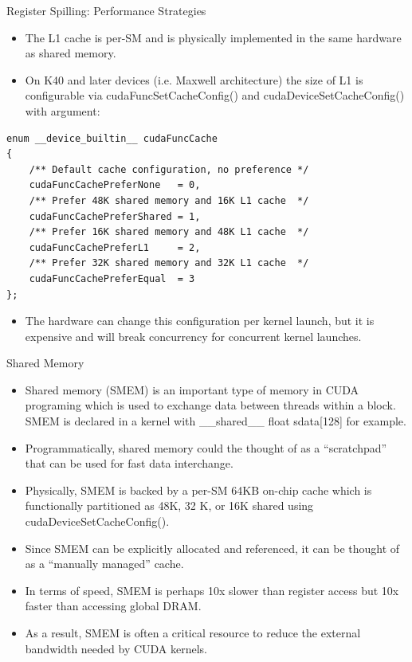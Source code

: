 \documentclass[handout]{beamer}
\begin{document}
\begin{frame}[fragile]{Register Spilling: Performance Strategies}
\begin{itemize}
         \item<1->The L1 cache is per-SM and is physically implemented in the same hardware as shared memory.
	\item<1->On K40 and later devices (i.e. Maxwell architecture) the size of L1 is configurable via {\selectfont cudaFuncSetCacheConfig()} and {\selectfont cudaDeviceSetCacheConfig()} with argument:
\end{itemize}
	\begin{lstlisting}
enum __device_builtin__ cudaFuncCache
{
    /** Default cache configuration, no preference */
    cudaFuncCachePreferNone   = 0,
    /** Prefer 48K shared memory and 16K L1 cache  */
    cudaFuncCachePreferShared = 1,
    /** Prefer 16K shared memory and 48K L1 cache  */
    cudaFuncCachePreferL1     = 2, 
    /** Prefer 32K shared memory and 32K L1 cache  */
    cudaFuncCachePreferEqual  = 3
};	
\end{lstlisting}
\begin{itemize}
	\item<1->The hardware can change this configuration per kernel launch, but it is expensive and will break concurrency for concurrent kernel launches.
\end{itemize}

\end{frame}

\begin{frame}{Shared Memory}
\begin{itemize}
	\item<1->Shared memory (SMEM) is an important type of memory in CUDA programing which is used to exchange data between threads within a block. SMEM is declared in a kernel with {\selectfont \_\_shared\_\_ float sdata[128]} for example. 
	\item<1->Programmatically, shared memory could the thought of as a ``scratchpad'' that can be used for fast data interchange.
	\item<1->Physically, SMEM is backed by a per-SM 64KB on-chip cache which is functionally partitioned as 48K, 32 K, or 16K shared using {\selectfont cudaDeviceSetCacheConfig()}.
	\item<1->Since SMEM can be explicitly allocated and referenced, it can be thought of as a ``manually managed'' cache. 
	\item<1->In terms of speed, SMEM is perhaps 10x slower than register access but 10x faster than accessing global DRAM.
	\item<1->As a result, SMEM is often a critical resource to reduce the external bandwidth needed by CUDA kernels.
\end{itemize}
\end{frame}
\end{document}
